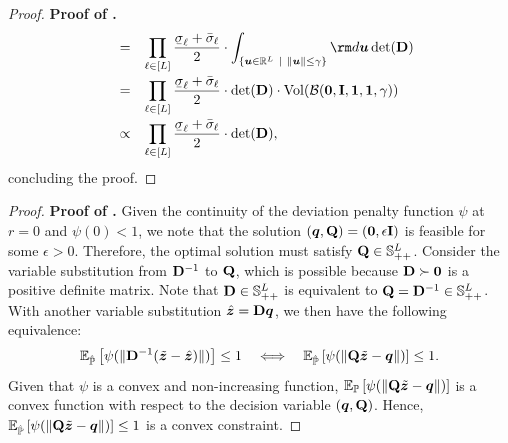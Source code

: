 \documentclass[opre, nonblindrev]{informswp}
\newcommand{\1}[1]{\mathds{1}{\left(#1\right)}}
\begin{document}
\begin{appendices}
\begin{proof}{\bf Proof of .}
$$\begin{array}{rcl}
& = & \displaystyle \prod_{\ell \in [L]} \frac{\ubar{\sigma}_{\ell} + \bar{\sigma}_{\ell}}{2} \cdot \int_{\{ \bm u \in \mathbb{R}^L ~|~ \| \bm u\| \leq \gamma \}} {\rm d} \bm u  \det(\mb D) \\[5mm]
& = & \displaystyle \prod_{\ell \in [L]} \frac{\ubar{\sigma}_{\ell} + \bar{\sigma}_{\ell}}{2} \cdot \det(\mb D) \cdot \mathrm{Vol}(\cB(\bm 0, \mb I, \bm 1, \bm 1,\gamma)) \\[5mm]
& \propto & \displaystyle \prod_{\ell \in [L]} \frac{\ubar{\sigma}_{\ell} + \bar{\sigma}_{\ell}}{2} \cdot \det(\mb D),
\end{array}
$$
concluding the proof.
\hfill \Halmos
\end{proof}
\vspace{3mm}

\begin{proof}{\bf Proof of .} 
Given the continuity of the deviation penalty function $\psi$ at $r=0$ and $\psi(0)<1$, we note that the solution $(\bm q, {\mathbf{Q}}) = ({\mathbf{0}}, \epsilon {\mathbf{I}})$ is feasible for some $\epsilon >0$. Therefore, the optimal solution must satisfy  ${\mathbf{Q}} \in \mathbb{S}^L_{++}$.  Consider the variable substitution from ${\mathbf{D}}^{-1}$ to  ${\mathbf{Q}}$, which is possible because ${\mathbf{D}}  \succ \bm 0$ is a positive definite matrix. Note that ${\mathbf{D}} \in  \mathbb{S}^{L}_{++}$ is equivalent to ${\mathbf{Q}} = {\mathbf{D}}^{-1} \in \mathbb{S}^{L}_{++}$. With another variable substitution $\hat{\bm{z}} = {\mathbf{D}}\bm{q}$, we then have the following equivalence:
$$
\mathbb{E}_{\hat{\mathbb{P}}}\left[\psi(\|{\mathbf{D}}^{-1}( \tilde{\bm{z}} - \hat{\bm{z}}) \|)\right] \leq 1 
~~~\Longleftrightarrow~~~
\mathbb{E}_{\hat{\mathbb{P}}}\left[\psi(\|{\mathbf{Q}} \tilde{\bm{z}} - \bm q \|)\right] \leq 1.
$$
Given that $\psi$ is a convex and non-increasing function, $\mathbb{E}_{\mathbb{P}}\left[\psi(\|{\mathbf{Q}} \tilde{\bm{z}} - \bm q \|)\right]$ is a convex function with respect to the decision variable $(\bm q,{\mathbf{Q}})$. Hence, $\mathbb{E}_{\hat{\mathbb{P}}}\left[\psi(\|{\mathbf{Q}} \tilde{\bm{z}} - \bm q \|)\right] \leq 1$ is a convex constraint.


\end{proof}
\end{appendices}
\end{document}
